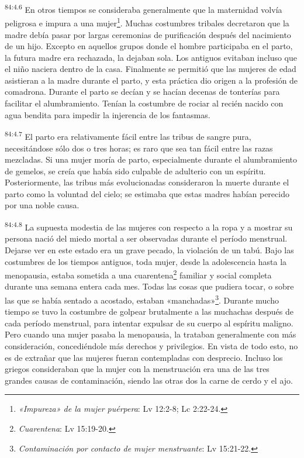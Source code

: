 \par
\textsuperscript{84:4.6} En otros tiempos se consideraba generalmente que la maternidad volvía peligrosa e impura a una mujer\footnote{\textit{«Impureza» de la mujer puérpera}: Lv 12:2-8; Lc 2:22-24.}. Muchas costumbres tribales decretaron que la madre debía pasar por largas ceremonias de purificación después del nacimiento de un hijo. Excepto en aquellos grupos donde el hombre participaba en el parto, la futura madre era rechazada, la dejaban sola. Los antiguos evitaban incluso que el niño naciera dentro de la casa. Finalmente se permitió que las mujeres de edad asistieran a la madre durante el parto, y esta práctica dio origen a la profesión de comadrona. Durante el parto se decían y se hacían decenas de tonterías para facilitar el alumbramiento. Tenían la costumbre de rociar al recién nacido con agua bendita para impedir la injerencia de los fantasmas.

\par
\textsuperscript{84:4.7} El parto era relativamente fácil entre las tribus de sangre pura, necesitándose sólo dos o tres horas; es raro que sea tan fácil entre las razas mezcladas. Si una mujer moría de parto, especialmente durante el alumbramiento de gemelos, se creía que había sido culpable de adulterio con un espíritu. Posteriormente, las tribus más evolucionadas consideraron la muerte durante el parto como la voluntad del cielo; se estimaba que estas madres habían perecido por una noble causa.

\par
\textsuperscript{84:4.8} La supuesta modestia de las mujeres con respecto a la ropa y a mostrar su persona nació del miedo mortal a ser observadas durante el período menstrual. Dejarse ver en este estado era un grave pecado, la violación de un tabú. Bajo las costumbres de los tiempos antiguos, toda mujer, desde la adolescencia hasta la menopausia, estaba sometida a una cuarentena\footnote{\textit{Cuarentena}: Lv 15:19-20.} familiar y social completa durante una semana entera cada mes. Todas las cosas que pudiera tocar, o sobre las que se había sentado a acostado, estaban «manchadas»\footnote{\textit{Contaminación por contacto de mujer menstruante}: Lv 15:21-22.}. Durante mucho tiempo se tuvo la costumbre de golpear brutalmente a las muchachas después de cada período menstrual, para intentar expulsar de su cuerpo al espíritu maligno. Pero cuando una mujer pasaba la menopausia, la trataban generalmente con más consideración, concediéndole más derechos y privilegios. En vista de todo esto, no es de extrañar que las mujeres fueran contempladas con desprecio. Incluso los griegos consideraban que la mujer con la menstruación era una de las tres grandes causas de contaminación, siendo las otras dos la carne de cerdo y el ajo.

